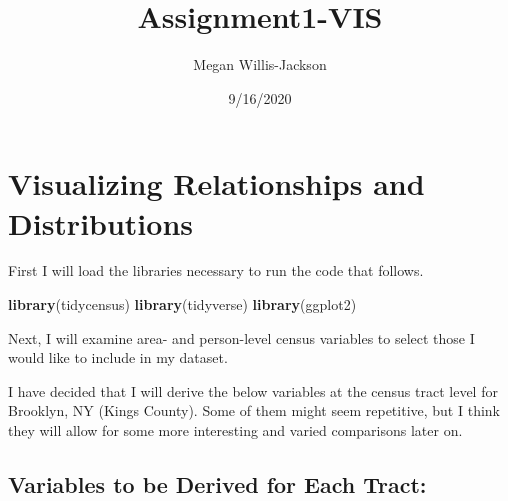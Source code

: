 \documentclass[
]{article}
\title{Assignment1-VIS}
\author{Megan Willis-Jackson}
\date{9/16/2020}
\newenvironment{Shaded}{\begin{snugshade}}{\end{snugshade}}
\newcommand{\DecValTok}[1]{\textcolor[rgb]{0.00,0.00,0.81}{#1}}
\newcommand{\KeywordTok}[1]{\textcolor[rgb]{0.13,0.29,0.53}{\textbf{#1}}}
\newcommand{\NormalTok}[1]{#1}
\newcommand{\OperatorTok}[1]{\textcolor[rgb]{0.81,0.36,0.00}{\textbf{#1}}}
\newcommand{\StringTok}[1]{\textcolor[rgb]{0.31,0.60,0.02}{#1}}
\begin{document}
\maketitle

\hypertarget{visualizing-relationships-and-distributions}{%
\section{Visualizing Relationships and
Distributions}\label{visualizing-relationships-and-distributions}}

First I will load the libraries necessary to run the code that follows.

\begin{Shaded}
\begin{Highlighting}[]
\KeywordTok{library}\NormalTok{(tidycensus)}
\KeywordTok{library}\NormalTok{(tidyverse)}
\KeywordTok{library}\NormalTok{(ggplot2)}
\end{Highlighting}
\end{Shaded}

Next, I will examine area- and person-level census variables to select
those I would like to include in my dataset.

\begin{Shaded}
\end{Shaded}

I have decided that I will derive the below variables at the census
tract level for Brooklyn, NY (Kings County). Some of them might seem
repetitive, but I think they will allow for some more interesting and
varied comparisons later on.

\hypertarget{variables-to-be-derived-for-each-tract}{%
\subsection{Variables to be Derived for Each
Tract:}\label{variables-to-be-derived-for-each-tract}}
\end{document}
